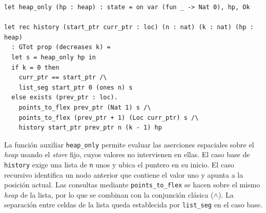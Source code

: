 \documentclass[a4paper,	11pt]{report}
\begin{document}
\begin{lstlisting}
let heap_only (hp : heap) : state = on var (fun _ -> Nat 0), hp, Ok

let rec history (start_ptr curr_ptr : loc) (n : nat) (k : nat) (hp : heap)
  : GTot prop (decreases k) =
  let s = heap_only hp in
  if k = 0 then
    curr_ptr == start_ptr /\
    list_seg start_ptr 0 (ones n) s
  else exists (prev_ptr : loc).
    points_to_flex prev_ptr (Nat 1) s /\
    points_to_flex (prev_ptr + 1) (Loc curr_ptr) s /\
    history start_ptr prev_ptr n (k - 1) hp
\end{lstlisting}

La función auxiliar \lstinline|heap_only| permite evaluar las aserciones espaciales sobre el
\emph{heap} usando el \emph{store} fijo,
cuyos valores no intervienen en ellas.
El caso base de \lstinline|history| exige una lista de \lstinline|n| unos y ubica el puntero en su inicio.
El caso recursivo identifica un nodo anterior que contiene el valor uno y apunta a la posición actual.
Las consultas mediante \lstinline|points_to_flex| se hacen sobre el mismo \emph{heap} de la lista,
por lo que se combinan con la conjunción clásica ($\land$).
La separación entre celdas de la lista queda establecida por \lstinline|list_seg| en el caso base.
\end{document}
